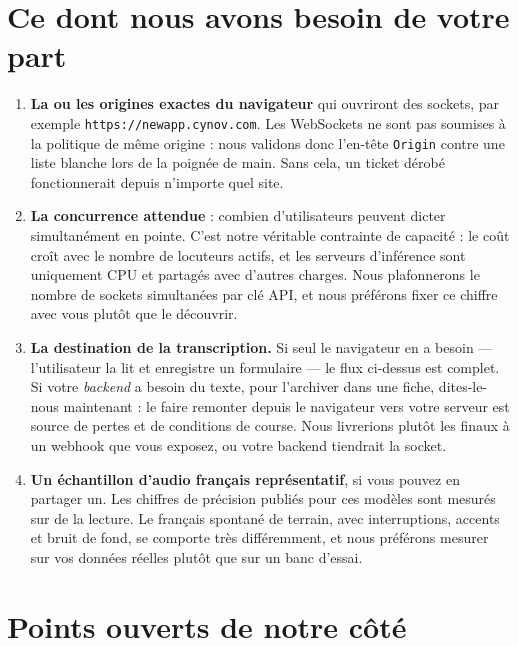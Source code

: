\documentclass[11pt,a4paper]{article}
\begin{document}
\section{Ce dont nous avons besoin de votre part}

\begin{askbox}
\begin{enumerate}
  \item \textbf{La ou les origines exactes du navigateur} qui ouvriront des sockets, par
        exemple \texttt{https://newapp.cynov.com}. Les WebSockets ne sont pas soumises à
        la politique de même origine : nous validons donc l'en-tête \texttt{Origin}
        contre une liste blanche lors de la poignée de main. Sans cela, un ticket dérobé
        fonctionnerait depuis n'importe quel site.
  \item \textbf{La concurrence attendue} : combien d'utilisateurs peuvent dicter
        simultanément en pointe. C'est notre véritable contrainte de capacité : le coût
        croît avec le nombre de locuteurs actifs, et les serveurs d'inférence sont
        uniquement CPU et partagés avec d'autres charges. Nous plafonnerons le nombre de
        sockets simultanées par clé API, et nous préférons fixer ce chiffre avec vous
        plutôt que le découvrir.
  \item \textbf{La destination de la transcription.} Si seul le navigateur en a besoin —
        l'utilisateur la lit et enregistre un formulaire — le flux ci-dessus est complet.
        Si votre \emph{backend} a besoin du texte, pour l'archiver dans une fiche,
        dites-le-nous maintenant : le faire remonter depuis le navigateur vers votre
        serveur est source de pertes et de conditions de course. Nous livrerions plutôt
        les finaux à un webhook que vous exposez, ou votre backend tiendrait la socket.
  \item \textbf{Un échantillon d'audio français représentatif}, si vous pouvez en
        partager un. Les chiffres de précision publiés pour ces modèles sont mesurés sur
        de la lecture. Le français spontané de terrain, avec interruptions, accents et
        bruit de fond, se comporte très différemment, et nous préférons mesurer sur vos
        données réelles plutôt que sur un banc d'essai.
\end{enumerate}
\end{askbox}

\section{Points ouverts de notre côté}
\end{document}
